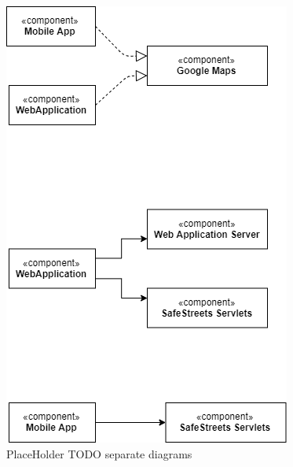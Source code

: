 \begin{figure}[H]
\centering
\includegraphics[width=\textwidth]{Images/Trheediams.png}
\caption{\label{fig:ComWI}PlaceHolder TODO separate diagrams}
\end{figure}
